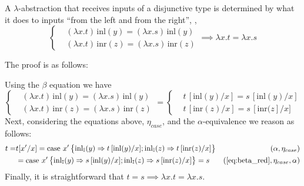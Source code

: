 A $\lambda$-abstraction that receives inputs of a disjunctive type is determined by what it does to inputs ``from the left and from the right'', \ie,
\[
\left\{
\begin{aligned}
&(\lambda x.t)\, \text{inl}(y) = (\lambda x.s)\, \text{inl}(y) \\
&(\lambda x.t)\, \text{inr}(z) =(\lambda x.s)\, \text{inr}(z)
\end{aligned}
\right.
\implies \lambda x.t = \lambda x.s
\]

The proof is as follows:

Using the $\beta$ equation we have
\begin{equation} \label{eq:beta_red}
  \left\{
\begin{aligned}
&(\lambda x.t)\, \text{inl}(y) = (\lambda x.s)\, \text{inl}(y) \\
&(\lambda x.t)\, \text{inr}(z) =(\lambda x.s)\, \text{inr}(z)
\end{aligned}
\right.
= \left\{
\begin{aligned}
&t\,[\text{inl}(y)/x]  = s\, [\text{inl}(y)/x] \\
&t\,[\text{inr}(z)/x]  = s\, [\text{inr}(z]/x] 
\end{aligned}
\right.
\end{equation}
Next, considering the equations above, $\eta_{case}$, and the $\alpha$-equivalence we reason as follows:
\begin{equation*}
\begin{split}
  t = & t[x'/x] = \text{case } x'  
    \left\{ \begin{aligned}
    \inl_{\typeI}(y) \Rightarrow t\,[\text{inl}(y)/x] ;  
    \inl_{\typeI}(z) \Rightarrow t\,[\text{inr}(z)/x]
  \end{aligned}  \right\} & (\alpha,\eta_{case})\\
  & = \text{case } x'  
    \left\{ \begin{aligned}
    \inl_{\typeI}(y) \Rightarrow s\,[\text{inl}(y)/x] ;  
    \inl_{\typeI}(z) \Rightarrow s\,[\text{inr}(z)/x]
  \end{aligned}  \right\} = s & (\text{\autoref{eq:beta_red}},\eta_{case},\alpha)
\end{split}
\end{equation*}
Finally, it is straightforward that $ t=s \implies \lambda x.t = \lambda x.s$.


